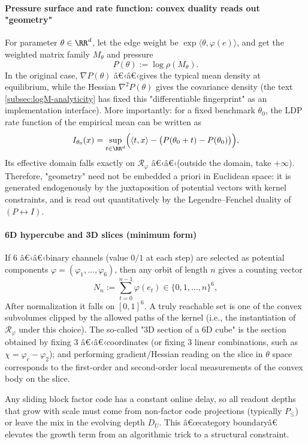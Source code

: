 \paragraph{Pressure surface and rate function: convex duality reads out "geometry"}
For parameter \(\theta\in\RR^d\), let the edge weight be \(\exp\langle\theta,\varphi(e)\rangle\), and get the weighted matrix family \(M_\theta\) and pressure
$$
P(\theta):=\log\rho(M_\theta).
$$
In the original case, \(\nabla P(\theta)\) â€‹â€‹gives the typical mean density at equilibrium, while the Hessian \(\nabla^2P(\theta)\) gives the covariance density (the text \ref{subsec:logM-analyticity} has fixed this "differentiable fingerprint" as an implementation interface).
More importantly: for a fixed benchmark \(\theta_0\), the LDP rate function of the empirical mean can be written as
$$
I_{\theta_0}(x)=\sup_{t\in\RR^d}\Bigl(\langle t,x\rangle-\bigl(P(\theta_0+t)-P(\theta_0)\bigr)\Bigr),
$$
Its effective domain falls exactly on \(\mathcal{R}_\varphi\) â€‹â€‹(outside the domain, take \(+\infty\)).
Therefore, "geometry" need not be embedded a priori in Euclidean space: it is generated endogenously by the juxtaposition of potential vectors with kernel constraints, and is read out quantitatively by the Legendre--Fenchel duality of \((P\leftrightarrow I)\).

\paragraph{6D hypercube and 3D slices (minimum form)}
If \(6\) â€‹â€‹binary channels (value \(0/1\) at each step) are selected as potential components \(\varphi=(\varphi_1,\dots,\varphi_6)\), then any orbit of length \(n\) gives a counting vector
$$
N_n:=\sum_{t=0}^{n-1}\varphi(e_t)\in\{0,1,\dots,n\}^6,
$$
After normalization it falls on \([0,1]^6\). A truly reachable set is one of the convex subvolumes clipped by the allowed paths of the kernel (i.e., the instantiation of \(\mathcal{R}_\varphi\) under this choice).
The so-called "3D section of a 6D cube" is the section obtained by fixing \(3\) â€‹â€‹coordinates (or fixing \(3\) linear combinations, such as \(\chi=\varphi_e-\varphi_2\)); and performing gradient/Hessian reading on the slice in \(\theta\) space corresponds to the first-order and second-order local measurements of the convex body on the slice.

\begin{remark}\label{rem:pom-factor-boundary}
Any sliding block factor code has a constant online delay, so all readout depths that grow with scale must come from non-factor code projections (typically $P_{\le}$) or leave the mix in the evolving depth $D_U$. This â€œcategory boundaryâ€ elevates the growth term from an algorithmic trick to a structural constraint.
\end{remark}

